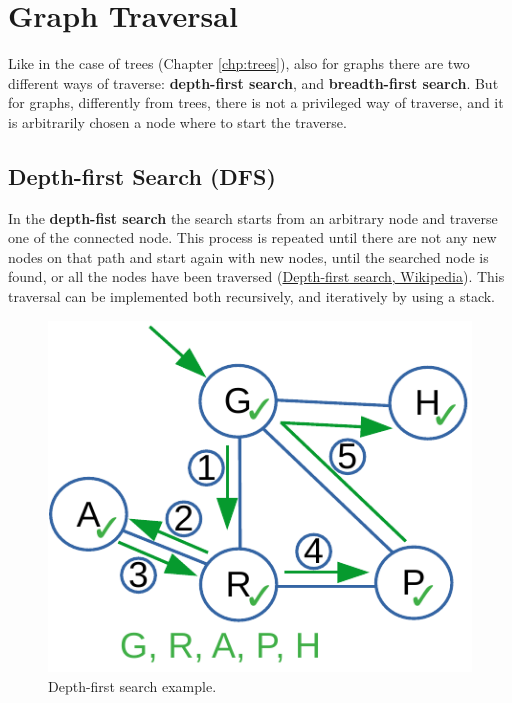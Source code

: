 \section{Graph Traversal}
Like in the case of trees (Chapter \ref{chp:trees}), also for graphs there are two different ways of traverse: \textbf{depth-first search}, and \textbf{breadth-first search}. But for graphs, differently from trees, there is not a privileged way of traverse, and it is arbitrarily chosen a node where to start the traverse.

\subsection{Depth-first Search (DFS)}
In the \textbf{depth-fist search} the search starts from an arbitrary node and traverse one of the connected node. This process is repeated until there are not any new nodes on that path and start again with new nodes, until the searched node is found, or all the nodes have been traversed \cite{wikidepthfirst} (\href{https://en.wikipedia.org/wiki/Depth-first_search}{Depth-first search, Wikipedia}). This traversal can be implemented both recursively, and iteratively by using a stack.

\begin{figure}[H]
	\begin{center}
		\includegraphics[scale=.6]{chapters/graphs/images/graphs_6.pdf}
		\caption[Depth-first search example.]{Depth-first search example.}
		\label{graphs_6}
	\end{center}
\end{figure}

